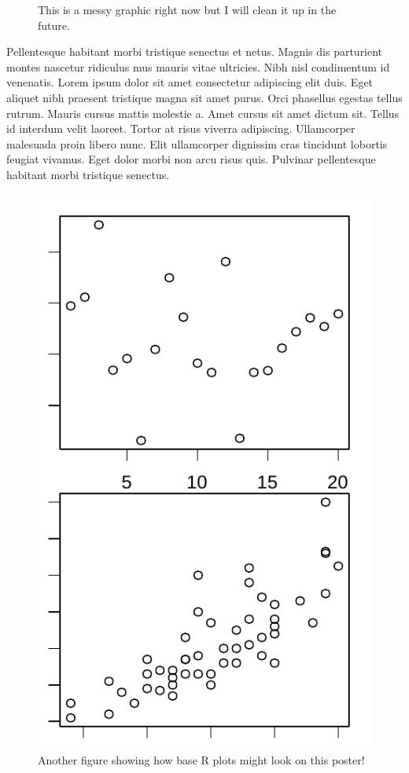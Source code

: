 \documentclass[article,30pt,extrafontsizes,showtrims]{memoir}
\begin{document}
\begin{multicols*}{3}
{\begin{figure}
{}

\caption{This is a messy graphic right now but I will clean it up in the future.}\label{fig:unnamed-chunk-4}
\end{figure}

Pellentesque habitant morbi tristique senectus et netus. Magnis dis
parturient montes nascetur ridiculus mus mauris vitae ultricies. Nibh
nisl condimentum id venenatis. Lorem ipsum dolor sit amet consectetur
adipiscing elit duis. Eget aliquet nibh praesent tristique magna sit
amet purus. Orci phasellus egestas tellus rutrum. Mauris cursus mattis
molestie a. Amet cursus sit amet dictum sit. Tellus id interdum velit
laoreet. Tortor at risus viverra adipiscing. Ullamcorper malesuada proin
libero nunc. Elit ullamcorper dignissim cras tincidunt lobortis feugiat
vivamus. Eget dolor morbi non arcu risus quis. Pulvinar pellentesque
habitant morbi tristique senectus.

\begin{figure}

{\centering \includegraphics[width=0.65\linewidth]{skeleton_files/figure-latex/unnamed-chunk-5-1} 

}

\caption{Another figure showing how base R plots might look on this poster!}\label{fig:unnamed-chunk-5}
\end{figure}

}
\end{multicols*}
\end{document}
